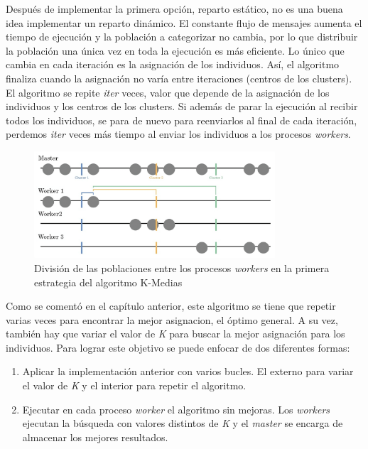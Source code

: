 	
		
		Después de implementar la primera opción, reparto estático, no es una buena idea implementar un reparto dinámico. El constante flujo de mensajes aumenta el tiempo de ejecución y la población a categorizar no cambia, por lo que distribuir la población una única vez en toda la ejecución es más eficiente. Lo único que cambia en cada iteración es la asignación de los individuos. Así, el algoritmo finaliza cuando la asignación no varía entre iteraciones (centros de los clusters). El algoritmo se repite \textit{iter} veces, valor que depende de la asignación de los individuos y los centros de los clusters. Si además de parar la ejecución al recibir todos los individuos, se para de nuevo para reenviarlos al final de cada iteración, perdemos \textit{iter} veces más tiempo al enviar los individuos a los procesos \textit{workers}. 
		
		
		\begin{figure} [!h]
			\centering
			\includegraphics[width=0.8\textwidth]{images/chapter_3/kmedias_mpi}	
			\caption{División de las poblaciones entre los procesos \textit{workers} en la primera estrategia del algoritmo K-Medias}
			\label{fig:kmediasdiv}
		\end{figure}
		
		
		
		Como se comentó en el capítulo anterior, este algoritmo se tiene que repetir varias veces para encontrar la mejor asignacion, el óptimo general. A su vez, también hay que variar el valor de \textit{K} para buscar la mejor asignación para los individuos. Para lograr este objetivo se puede enfocar de dos diferentes formas:
		
		\begin{enumerate}
			\item Aplicar la implementación anterior con varios bucles. El externo para variar el valor de \textit{K} y el interior para repetir el algoritmo.
			\item Ejecutar en cada proceso \textit{worker} el algoritmo sin mejoras. Los \textit{workers} ejecutan la búsqueda con valores distintos de \textit{K} y el \textit{master} se encarga de almacenar los mejores resultados.
		\end{enumerate}
		
